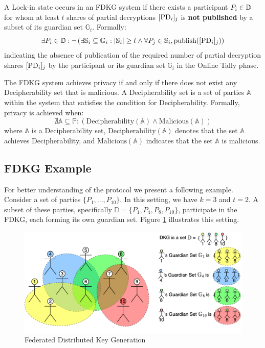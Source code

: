 \documentclass{article}
\begin{document}
\begin{definition}[Lock-in] \label{def:lock-in}
    A Lock-in state occurs in an FDKG system if there exists a participant $P_{i} \in \mathbb{D}$ for whom at least $t$ shares of partial decryptions $[\mathrm{PD}_{i}]_{j}$ is \textbf{not published} by a subset of its guardian set $\mathbb{G}_i$. Formally:
    \[
    \exists P_{i} \in \mathbb{D} : \neg \left( \exists \mathbb{S}_i \subseteq \mathbb{G}_i : |\mathbb{S}_i| \geq t \land \forall P_{j} \in \mathbb{S}_i, \text{publish}([\mathrm{PD}_{i}]_{j}) \right)
    \]
    indicating the absence of publication of the required number of partial decryption shares $[\mathrm{PD}_{i}]_{j}$ by the participant or its guardian set $\mathbb{G}_i$ in the Online Tally phase.
\end{definition}


\begin{definition}[Privacy] \label{def:privacy}
    The FDKG system achieves privacy if and only if there does not exist any Decipherability set that is malicious. A Decipherability set is a set of parties \( \mathbb{A} \) within the system that satisfies the condition for Decipherability. Formally, privacy is achieved when:
    \[
    \nexists \mathbb{A} \subseteq \mathbb{P} : (\text{Decipherability}(\mathbb{A}) \land \text{Malicious}(\mathbb{A}))
    \]
    where \( \mathbb{A} \) is a Decipherability set, \( \text{Decipherability}(\mathbb{A}) \) denotes that the set \( \mathbb{A} \) achieves Decipherability, and \( \text{Malicious}(\mathbb{A}) \) indicates that the set \( \mathbb{A} \) is malicious.
\end{definition}



\subsection*{FDKG Example}
For better understanding of the protocol we present a following example. Consider a set of parties $\{P_1, \ldots, P_{10}\}$. In this setting, we have $k = 3$ and $t = 2$. A subset of these parties, specifically $\mathbb{D} = \{P_1, P_4, P_8, P_{10}\}$, participate in the FDKG, each forming its own guardian set. Figure \ref{fig:FDKG} illustrates this setting.


\begin{figure}
    \centering
    \includegraphics[width=\textwidth]{FDKG.png}
    \caption{Federated Distributed Key Generation}
    \label{fig:FDKG}
\end{figure}
\end{document}
